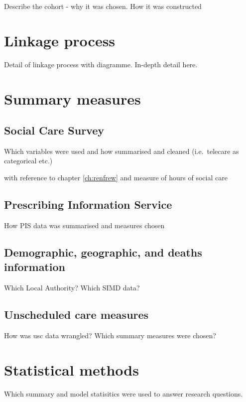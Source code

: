 \documentclass[12pt,]{report}
\begin{document}
Describe the cohort - why it was chosen. How it was constructed

\section{Linkage process}\label{sec:linkage}

Detail of linkage process with diagramme. In-depth detail here.

\section{Summary measures}\label{sec:summaries}

\subsection{Social Care Survey}\label{subsec:scs-summs}

Which variables were used and how summarised and cleaned (i.e.~telecare
as categorical etc.)

with reference to chapter \ref{ch:renfrew} and measure of hours of
social care

\subsection{Prescribing Information Service}\label{subsec:pis-summs}

How PIS data was summarised and measures chosen

\subsection{Demographic, geographic, and deaths information}\label{subsec:nrs-summs}

Which Local Authority? Which SIMD data?

\subsection{Unscheduled care measures}\label{subsec:usc-summs}

How was usc data wrangled? Which summary measures were chosen?

\section{Statistical methods}

Which summary and model statisitics were used to answer research
questions.
\end{document}
